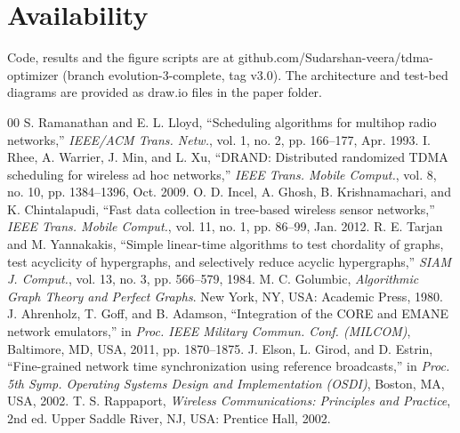 \documentclass[conference]{IEEEtran}
\begin{document}
\section*{Availability}
Code, results and the figure scripts are at github.com/Sudarshan-veera/tdma-optimizer (branch evolution-3-complete, tag v3.0). The architecture and test-bed diagrams are provided as draw.io files in the paper folder.

\begin{thebibliography}{00}
 S. Ramanathan and E. L. Lloyd, ``Scheduling algorithms for multihop radio networks,'' \emph{IEEE/ACM Trans. Netw.}, vol. 1, no. 2, pp. 166--177, Apr. 1993.
 I. Rhee, A. Warrier, J. Min, and L. Xu, ``DRAND: Distributed randomized TDMA scheduling for wireless ad hoc networks,'' \emph{IEEE Trans. Mobile Comput.}, vol. 8, no. 10, pp. 1384--1396, Oct. 2009.
 O. D. Incel, A. Ghosh, B. Krishnamachari, and K. Chintalapudi, ``Fast data collection in tree-based wireless sensor networks,'' \emph{IEEE Trans. Mobile Comput.}, vol. 11, no. 1, pp. 86--99, Jan. 2012.
 R. E. Tarjan and M. Yannakakis, ``Simple linear-time algorithms to test chordality of graphs, test acyclicity of hypergraphs, and selectively reduce acyclic hypergraphs,'' \emph{SIAM J. Comput.}, vol. 13, no. 3, pp. 566--579, 1984.
 M. C. Golumbic, \emph{Algorithmic Graph Theory and Perfect Graphs}. New York, NY, USA: Academic Press, 1980.
 J. Ahrenholz, T. Goff, and B. Adamson, ``Integration of the CORE and EMANE network emulators,'' in \emph{Proc. IEEE Military Commun. Conf. (MILCOM)}, Baltimore, MD, USA, 2011, pp. 1870--1875.
 J. Elson, L. Girod, and D. Estrin, ``Fine-grained network time synchronization using reference broadcasts,'' in \emph{Proc. 5th Symp. Operating Systems Design and Implementation (OSDI)}, Boston, MA, USA, 2002.
 T. S. Rappaport, \emph{Wireless Communications: Principles and Practice}, 2nd ed. Upper Saddle River, NJ, USA: Prentice Hall, 2002.
\end{thebibliography}
\end{document}
